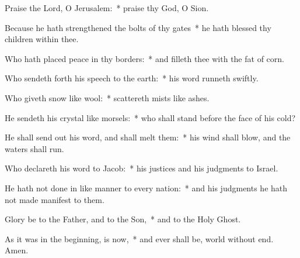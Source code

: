 \begin{enpars}
\item Praise the Lord, O Jerusalem:~* praise thy God, O Sion.
\item Because he hath strengthened the bolts of thy gates~* he hath blessed thy children within thee.
\item Who hath placed peace in thy borders:~* and filleth thee with the fat of corn.
\item Who sendeth forth his speech to the earth:~* his word runneth swiftly.
\item Who giveth snow like wool:~* scattereth mists like ashes.
\item He sendeth his crystal like morsels:~* who shall stand before the face of his cold?
\item He shall send out his word, and shall melt them:~* his wind shall blow, and the waters shall run.
\item Who declareth his word to Jacob:~* his justices and his judgments to Israel.
\item He hath not done in like manner to every nation:~* and his judgments he hath not made manifest to them.
\item Glory be to the Father, and to the Son,~* and to the Holy Ghost. 
\item As it was in the beginning, is now,~* and ever shall be, world without end. Amen.
\end{enpars}